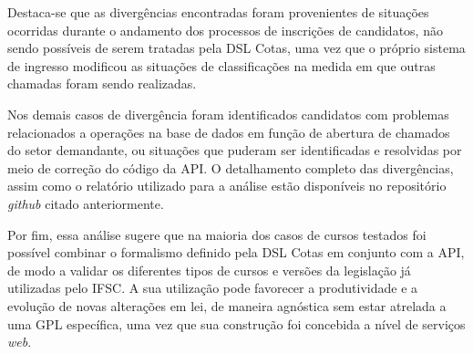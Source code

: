 Destaca-se que as divergências encontradas foram provenientes de situações ocorridas durante o andamento dos processos de inscrições de candidatos, não sendo possíveis de serem tratadas pela DSL Cotas, uma vez que o próprio sistema de ingresso modificou as situações de classificações na medida em que outras chamadas foram sendo realizadas.

Nos demais casos de divergência foram identificados candidatos com problemas relacionados a operações na base de dados em função de abertura de chamados do setor demandante, ou situações que puderam ser identificadas e resolvidas por meio de correção do código da API. O detalhamento completo das divergências, assim como o relatório utilizado para a análise estão disponíveis no repositório \textit{github} citado anteriormente.

Por fim, essa análise sugere que na maioria dos casos de cursos testados foi possível combinar o formalismo definido pela DSL Cotas em conjunto com a API, de modo a validar os diferentes tipos de cursos e versões da legislação já utilizadas pelo \gls{IFSC}. A sua utilização pode favorecer a produtividade e a evolução de novas alterações em lei, de maneira agnóstica sem estar atrelada a uma \gls{GPL} específica, uma vez que sua construção foi concebida a nível de serviços \textit{web}.